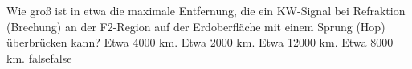     {Wie groß ist in etwa die maximale Entfernung, die ein KW-Signal bei Refraktion (Brechung) an der F2-Region auf der Erdoberfläche mit einem Sprung (Hop) überbrücken kann?}
    {Etwa 4000 km.}
    {Etwa 2000 km.}
    {Etwa 12000 km.}
    {Etwa 8000 km.}
    {false}{false}